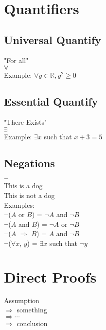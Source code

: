 \documentclass[12pt]{article}
\theoremstyle{remark}
\begin{document}
	\section{Quantifiers}

	\subsection{Universal Quantify}
	\begin{center}
		"For all"\\
		$\forall$\\
		Example: $\forall y \in \mathbb{R}, y^2 \geqslant 0$\\
	\end{center}
	\subsection{Essential Quantify}
	\begin{center}
		"There Exists"\\
		$\exists$\\
		Example: $\exists x$ such that $x + 3 = 5$\\
	\end{center}
	\subsection{Negations}
	\begin{center}
		$\neg$ \\ 
		This is a dog\\
		This is not a dog\\
		Examples: \\
		$\neg$($A$ or $B$) = $\neg A$ and $\neg B$ \\
		$\neg$($A$ and $B$) = $\neg A$ or $\neg B$ \\
		$\neg$($A$ $\Rightarrow$ $B$) = $A$ and $\neg B$ \\
		$\neg$($\forall x$, $y$) = $\exists x$ such that $\neg y$ \\

	\end{center}


	\section{Direct Proofs}
	\begin{center}
		Assumption\\ 
		$\Rightarrow$ something \\ 
		$\Rightarrow \cdots$ \\
		$\Rightarrow$ conclusion \\
	\end{center}
\end{document}
